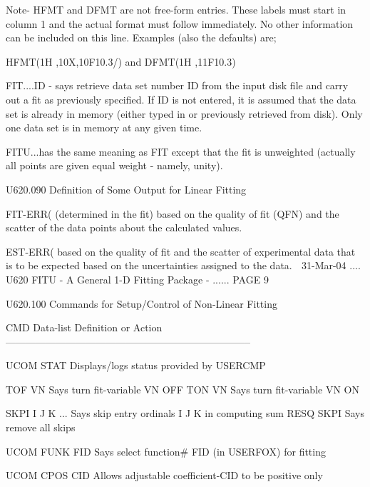           Note-  HFMT  and  DFMT  are not free-form entries. These labels must
          start in column 1 and the actual format must follow immediately.  No
          other  information  can be included on this line. Examples (also the
          defaults) are;
 
          HFMT(1H ,10X,10F10.3/)  and  DFMT(1H ,11F10.3)
 
   FIT....ID - says retrieve data set number ID from the input disk  file  and
          carry  out  a  fit as previously specified. If ID is not entered, it
          is assumed that the data set is already in memory (either  typed  in
          or  previously  retrieved from disk). Only one data set is in memory
          at any given time.
 
   FITU...has the same meaning as  FIT  except  that  the  fit  is  unweighted
          (actually all points are given equal weight - namely, unity).
 
 
   U620.090  Definition of Some Output for Linear Fitting
 
   FIT-ERR(%
          (determined in the fit) based on the quality of fit  (QFN)  and  the
          scatter of the data points about the calculated values.
 
   EST-ERR(%
          based on the quality of fit and the  scatter  of  experimental  data
          that  is  to  be expected based on the uncertainties assigned to the
          data.
    
   31-Mar-04 .... U620  FITU - A General 1-D Fitting Package - ...... PAGE   9
 
 
 
   U620.100  Commands for Setup/Control of Non-Linear Fitting
 
 
   CMD  Data-list   Definition or Action
   --------------------------------------------------------------------------
 
   UCOM STAT        Displays/logs status provided by USERCMP
 
   TOF  VN          Says turn fit-variable VN OFF
   TON  VN          Says turn fit-variable VN ON
 
   SKPI I J K ...   Says skip entry ordinals I J K in computing sum RESQ
   SKPI             Says remove all skips
 
   UCOM FUNK FID    Says select function# FID (in USERFOX) for fitting
 
   UCOM CPOS CID    Allows adjustable coefficient-CID to be positive only
 
